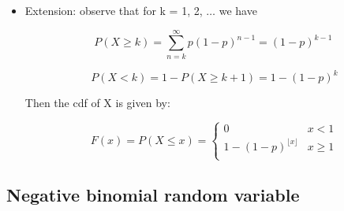 \documentclass[12pt]{report}
\renewcommand{\_}{\kern-1.5pt\textunderscore\kern-1.5pt}
\begin{document}
\begin{itemize}
\begin{itemize}
	\item Extension: observe that for k = 1, 2, $ \ldots $  we have\par

 \[ P \left( X \geq k \right) = \sum _{n=k}^{\infty}p \left( 1-p \right) ^{n-1}= \left( 1-p \right) ^{k-1}\mathrm{~} \] \par

 \[ P \left( X<k \right) =1-P \left( X \geq k+1 \right) =1- \left( 1-p \right) ^{k} \] \par

Then the cdf of X is given by:\par

 \[ F \left( x \right) =P \left( X \leq x \right) = \left\{ \begin{matrix}
0  &  x<1\\
1- \left( 1-p \right) ^{ \lfloor x \rfloor }  &  x \geq 1\\
\end{matrix}
  \] \par


\end{itemize}
\end{itemize}\subsection*{Negative binomial random variable}
\end{document}
